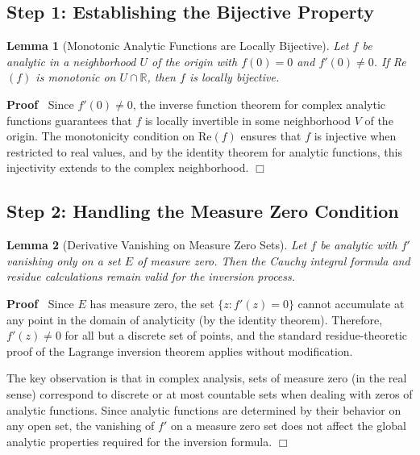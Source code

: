 \documentclass{article}
\newenvironment{proof}{\noindent\textbf{Proof\ }}{\hspace*{\fill}$\Box$\medskip}
\newtheorem{lemma}{Lemma}
\begin{document}
\subsection{Step 1: Establishing the Bijective Property}

\begin{lemma}
  [Monotonic Analytic Functions are Locally Bijective] Let $f$ be analytic in
  a neighborhood $U$ of the origin with $f (0) = 0$ and $f' (0) \neq 0$. If
  Re$(f)$ is monotonic on $U \cap \mathbb{R}$, then $f$ is locally bijective.
\end{lemma}

\begin{proof}
  Since $f' (0) \neq 0$, the inverse function theorem for complex analytic
  functions guarantees that $f$ is locally invertible in some neighborhood $V$
  of the origin. The monotonicity condition on Re$(f)$ ensures that $f$ is
  injective when restricted to real values, and by the identity theorem for
  analytic functions, this injectivity extends to the complex neighborhood.
\end{proof}

\subsection{Step 2: Handling the Measure Zero Condition}

\begin{lemma}
  [Derivative Vanishing on Measure Zero Sets] Let $f$ be analytic with $f'$
  vanishing only on a set $E$ of measure zero. Then the Cauchy integral
  formula and residue calculations remain valid for the inversion process.
\end{lemma}

\begin{proof}
  Since $E$ has measure zero, the set $\{z : f' (z) = 0\}$ cannot accumulate
  at any point in the domain of analyticity (by the identity theorem).
  Therefore, $f' (z) \neq 0$ for all but a discrete set of points, and the
  standard residue-theoretic proof of the Lagrange inversion theorem applies
  without modification.
  
  The key observation is that in complex analysis, sets of measure zero (in
  the real sense) correspond to discrete or at most countable sets when
  dealing with zeros of analytic functions. Since analytic functions are
  determined by their behavior on any open set, the vanishing of $f'$ on a
  measure zero set does not affect the global analytic properties required for
  the inversion formula.
\end{proof}
\end{document}
